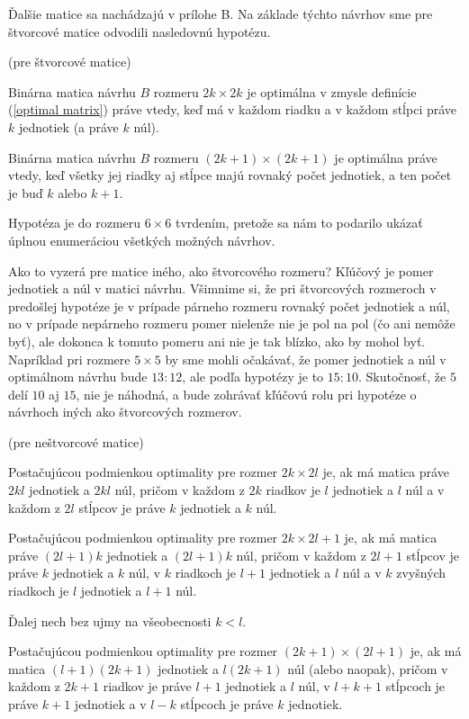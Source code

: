 Ďalšie matice sa nachádzajú v prílohe B. Na základe týchto návrhov sme pre štvorcové matice odvodili nasledovnú hypotézu.

\begin{hypoteza}
\label{hypoteza1}
(pre štvorcové matice)

Binárna matica návrhu $B$ rozmeru $2k \times 2k$ je optimálna v zmysle definície (\ref{optimal matrix}) práve vtedy, 
keď má v každom riadku a v každom stĺpci práve $k$ jednotiek (a práve $k$ núl).

Binárna matica návrhu $B$ rozmeru $(2k + 1) \times (2k + 1)$ je optimálna práve vtedy, 
keď všetky jej riadky aj stĺpce majú rovnaký počet jednotiek, a ten počet je buď $k$ alebo $k + 1$.
\end{hypoteza}

\begin{com}
Hypotéza je do rozmeru $6 \times 6$ tvrdením, pretože sa nám to podarilo ukázať úplnou enumeráciou všetkých možných návrhov.
\end{com}

Ako to vyzerá pre matice iného, ako štvorcového rozmeru? 
Kľúčový je pomer jednotiek a núl v matici návrhu. 
Všimnime si, že pri štvorcových rozmeroch v predošlej hypotéze je v prípade párneho rozmeru rovnaký počet jednotiek a núl, 
no v prípade nepárneho rozmeru pomer nielenže nie je pol na pol (čo ani nemôže byť), 
ale dokonca k tomuto pomeru ani nie je tak blízko, ako by mohol byť. 
Napríklad pri rozmere $5 \times 5$ by sme mohli očakávať, že pomer jednotiek a núl v optimálnom návrhu bude $13:12$, 
ale podľa hypotézy je to $15:10$. Skutočnosť, že $5$ delí $10$ aj $15$, nie je náhodná, 
a bude zohrávať kľúčovú rolu pri hypotéze o návrhoch iných ako štvorcových rozmerov.

\begin{hypoteza}
\label{hypoteza2}
(pre neštvorcové matice)

Postačujúcou podmienkou optimality pre rozmer $2k \times 2l$ je, ak má matica práve $2kl$ jednotiek a $2kl$ núl, 
pričom v každom z $2k$ riadkov je $l$ jednotiek a $l$ núl a v každom z $2l$ stĺpcov je práve $k$ jednotiek a $k$ núl.

Postačujúcou podmienkou optimality pre rozmer $2k \times 2l + 1$ je, ak má matica práve $(2l + 1)k$ jednotiek a $(2l + 1)k$ núl, 
pričom v každom z $2l + 1$ stĺpcov je práve $k$ jednotiek a $k$ núl, v $k$ riadkoch je $l + 1$ jednotiek a $l$ núl 
a v $k$ zvyšných riadkoch je $l$ jednotiek a $l + 1$ núl.

Ďalej nech bez ujmy na všeobecnosti $k < l$.

Postačujúcou podmienkou optimality pre rozmer $(2k + 1) \times (2l + 1)$ je, 
ak má matica $(l + 1)(2k + 1)$ jednotiek a $l(2k + 1)$ núl (alebo naopak), 
pričom v každom z $2k + 1$ riadkov je práve $l + 1$ jednotiek a $l$ núl, v $l + k + 1$ stĺpcoch je práve $k + 1$
jednotiek a v $l - k$ stĺpcoch je práve $k$ jednotiek.
\end{hypoteza}

